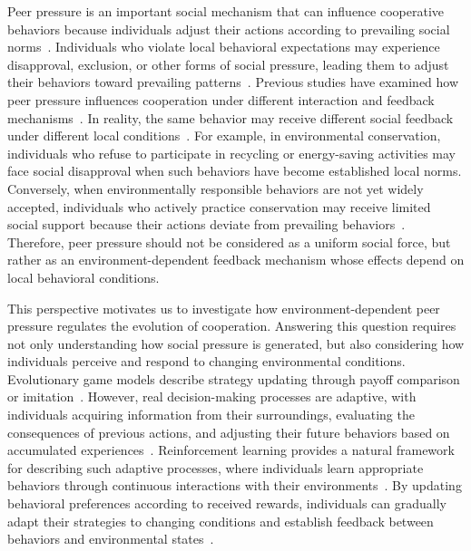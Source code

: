\documentclass[%
  aip,
  amsmath,amssymb,
  reprint,
  showkeys,
]{revtex4-1}
\begin{document}
Peer pressure is an important social mechanism that can influence cooperative behaviors because individuals adjust their actions according to prevailing social norms~\cite{yang2015peer,deng2018peer}. 
Individuals who violate local behavioral expectations may experience disapproval, exclusion, or other forms of social pressure, leading them to adjust their behaviors toward prevailing patterns~\cite{asch1952social}. 
Previous studies have examined how peer pressure influences cooperation under different interaction and feedback mechanisms~\cite{hu2021peer,gao2023impact,ma2025evolution,xu2026synergistic}. 
In reality, the same behavior may receive different social feedback under different local conditions~\cite{zhu2024synergy,hu2025dynamic}. 
For example, in environmental conservation, individuals who refuse to participate in recycling or energy-saving activities may face social disapproval when such behaviors have become established local norms. 
Conversely, when environmentally responsible behaviors are not yet widely accepted, individuals who actively practice conservation may receive limited social support because their actions deviate from prevailing behaviors~\cite{cialdini1990focus}. 
Therefore, peer pressure should not be considered as a uniform social force, but rather as an environment-dependent feedback mechanism whose effects depend on local behavioral conditions.

This perspective motivates us to investigate how environment-dependent peer pressure regulates the evolution of cooperation. 
Answering this question requires not only understanding how social pressure is generated, but also considering how individuals perceive and respond to changing environmental conditions. 
Evolutionary game models describe strategy updating through payoff comparison or imitation~\cite{szabo2007evolutionary,traulsen2010human}. 
However, real decision-making processes are adaptive, with individuals acquiring information from their surroundings, evaluating the consequences of previous actions, and adjusting their future behaviors based on accumulated experiences~\cite{young2009learning}. 
Reinforcement learning provides a natural framework for describing such adaptive processes, where individuals learn appropriate behaviors through continuous interactions with their environments~\cite{mckee2023scaffolding,shi2024model,zheng2024evolution,koster2025deep,wang2025spatial,mintz2025evolutionary,lee2025granular,li2025cooperation,xie2026reinforcement,zheng2026brief}. 
By updating behavioral preferences according to received rewards, individuals can gradually adapt their strategies to changing conditions and establish feedback between behaviors and environmental states~\cite{shen2024adaptive,lv2025reinforcement,li2025environmental}.
\end{document}
